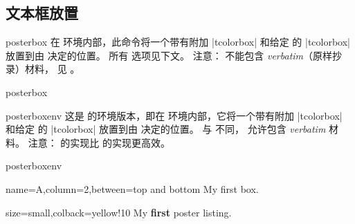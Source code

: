 \clearpage
\subsection{文本框放置}\label{subsec:poster_boxplacement}

\begin{docCommand}[doc new=2017-07-03]{posterbox}{}
  在  环境内部，此命令将一个带有附加
  |tcolorbox|  和给定  的 |tcolorbox|
  放置到由  决定的位置。
  所有  选项见下文。
  注意： 不能包含 \emph{verbatim}（原样抄录）材料，
  见 。
\begin{exdispExample}{posterbox}
\begin{tcbposter}[
  poster = {showframe,height=4cm,spacing=2mm,rows=2},
  boxes  = {beamer,colframe=blue!50!black,colback=blue!50,colupper=yellow!50},
]
\end{tcbposter}
\end{exdispExample}
\end{docCommand}

\begin{docEnvironment}[doc new=2017-07-03]{posterboxenv}{}
  这是  的环境版本，即在 
  环境内部，它将一个带有附加 |tcolorbox|  和给定
   的 |tcolorbox| 放置到由  决定的位置。
  与  不同， 允许包含 \emph{verbatim} 材料。
  注意： 的实现比  的实现更高效。

\enlargethispage*{1cm}
\begin{exdispExample}{posterboxenv}
\begin{tcbposter}[
  poster = {showframe,height=4cm,spacing=2mm,rows=2},
  boxes  = {size=small,beamer,
            colframe=blue!50!black,colback=blue!50,colupper=yellow!50},
]
\begin{posterboxenv}[title=My title]{name=A,column=2,between=top and bottom}
  My first box.
  \begin{tcblisting}{size=small,colback=yellow!10}
My \textbf{first}
poster listing.
  \end{tcblisting}
\end{posterboxenv}
\end{tcbposter}
\end{exdispExample}

\end{docEnvironment}


